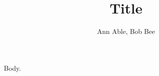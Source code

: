 \documentclass{article}
\title{Title}
\author{Ann Able\orcidAuthor{0000-0001-8817-2744}, Bob Bee\orcidAuthor{0000-0002-6100-8255}}
\begin{document}
\maketitle
Body.
\end{document}
